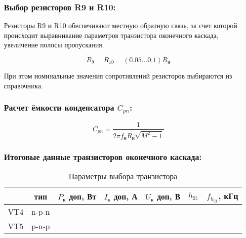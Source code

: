 \subsubsection{Выбор резисторов R9 и R10:}
Резисторы R9 и R10 обеспечивают местную обратную связь, за счет которой происходит выравнивание параметров транзистора оконечного каскада, увеличение полосы пропускания.

\begin{equation}
\label{eq:equation2_21}
 R_{\text{9}} = R_{\text{10}} = (0.05 \ldots 0.1) R_{\text{н}}
\end{equation}
\begin{equation*}
  
\end{equation*}

При этом номинальные значения сопротивлений резисторов выбираются из справочника.

\subsubsection{Расчет ёмкости конденсатора $C_{pn}$:}

\begin{equation}
\label{eq:equation2_22}
 C_{pn} = \dfrac{1}{2 \pi f_{\text{н}} R_{\text{н}} \sqrt{M^2 - 1} }
\end{equation}
\begin{equation*}
  
\end{equation*}

\subsubsection{Итоговые данные транзисторов оконечного каскада:}

\begin{table}[htbp]
\caption{Параметры выбора транзистора }
\begin{center}\begin{tabular}{|c|c|c|c|c|c|c|}
\hline 
  & тип & $P_{\text{к}}$ доп, Вт & $I_{\text{к}}$ доп, А & $U_{\text{к}}$ доп, В & $h_{21}$ &  $f_{h_{21}}$, кГц \\ 
\hline 
VT4 & n-p-n &   &  &  &  & \\ 
\hline 
VT5 & p-n-p &   &  &  &  &  \\ 
\hline 
\end{tabular} 
\end{center}
\end{table}

